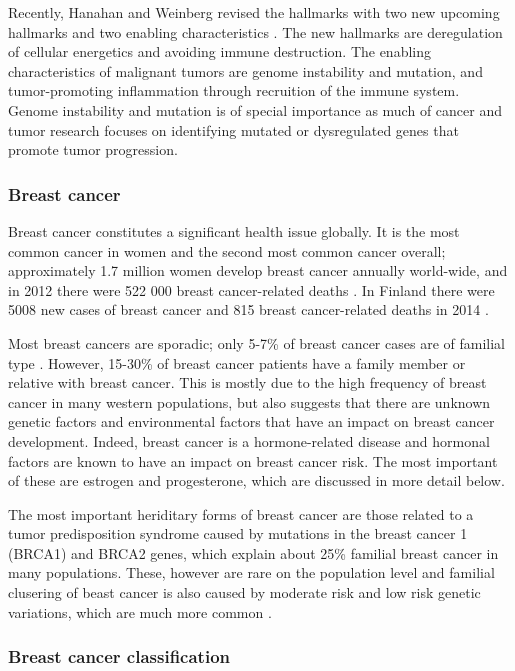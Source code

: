 Recently, Hanahan and Weinberg revised the hallmarks with two new upcoming
hallmarks and two enabling characteristics \citep{Hanahan2011}. The new
hallmarks are deregulation of cellular energetics and avoiding immune
destruction. The enabling characteristics of malignant tumors are genome
instability and mutation, and tumor-promoting inflammation through recruition
of the immune system. Genome instability and mutation is of special importance
as much of cancer and tumor research focuses on identifying mutated or
dysregulated genes that promote tumor progression.



\subsubsection{Breast cancer}\label{breast-cancer}

Breast cancer constitutes a significant health issue globally. It is the most
common cancer in women and the second most common cancer overall;
approximately 1.7 million women develop breast cancer annually world-wide, and
in 2012 there were 522 000 breast cancer-related deaths
\citep{Ferlay2015}. In Finland there were 5008 new cases of breast cancer
 and 815 breast cancer-related deaths in 2014 \citep{Syoparekisteri}.

Most breast cancers are sporadic; only 5-7\% of breast cancer cases are of
familial type \citep{Melchor2013}. However, 15-30\% of breast cancer patients
have a family member or relative with breast cancer. This is
mostly due to the high frequency of breast cancer in many western populations,
but also suggests that there are unknown genetic factors and environmental
factors that have an impact on breast cancer development. Indeed, breast
cancer is a hormone-related disease and hormonal factors are known to have an
impact on breast cancer risk. The most important of these are
estrogen and progesterone, which are discussed in more detail below.

The most important heriditary forms of breast cancer are those related to a
tumor predisposition syndrome caused by mutations in the breast cancer 1
(BRCA1) and BRCA2 genes, which explain about 25\% familial breast cancer in
many populations. These, however are rare on the population level and familial
clusering of beast cancer is also caused by moderate risk and low risk genetic
variations, which are much more common \citep{Melchor2013}.


\subsubsection{Breast cancer classification}\label{breast-cancer-classification}

